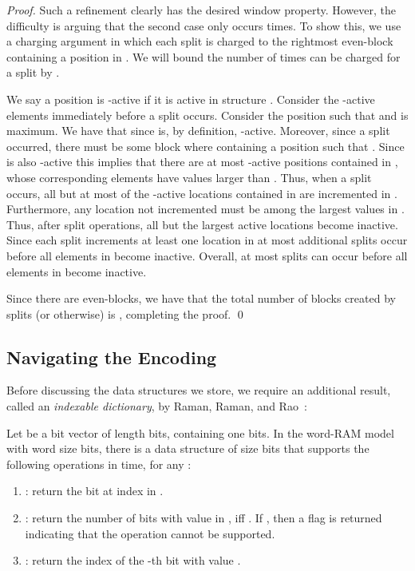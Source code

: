 \documentclass[runningheads]{llncs}
\begin{document}
\begin{proof}
Such a refinement clearly has the desired window property.  However,
the difficulty is arguing that the second case only occurs  times.  To show this, we use a charging argument in which each
split is charged to the rightmost even-block 
containing a position in .  We
will bound the number of times  can be charged for a
split by .

We say a position is -active if it is active in structure .
Consider the -active elements immediately before a split
occurs.  Consider the position  such that  and  is maximum.  We have that 
since  is, by definition, -active.  Moreover, since a
split occurred, there must be some block  where  containing a position  such that .  Since  is also -active this implies that
there are at most  -active positions contained in
, whose corresponding elements have values larger than
.  Thus, when a split occurs, all but at most  of the
-active locations contained in  are
incremented in .  Furthermore, any location not incremented
must be among the  largest values in .  Thus,
after  split operations, all but the  largest active locations
become inactive.  Since each split increments at least one location in
 at most  additional splits occur before all
elements in  become inactive.  Overall, at most  splits can occur before all elements in
 become inactive.

Since there are  even-blocks, we have that the total number of
blocks created by splits (or otherwise) is , completing
the proof. \qed
\end{proof}

\subsection{Navigating the Encoding}

Before discussing the data structures we store, we require an
additional result, called an \emph{indexable dictionary},
by Raman, Raman, and Rao~\cite{RRR07}:

\begin{lemma}\label{lem:rrr-id} Let  be a
  bit vector of length  bits, containing  one bits.  In the
  word-RAM model with word size  bits, there is a data
  structure of size  bits that supports the
  following operations in  time, for any :
\begin{enumerate}
\item : return the bit at index  in .
\item : return the number of bits with
  value  in , iff .  If , then a flag is returned
  indicating that the operation cannot be supported.
\item : return the index of the -th
  bit with value .
\end{enumerate}
\end{lemma}
\end{document}
